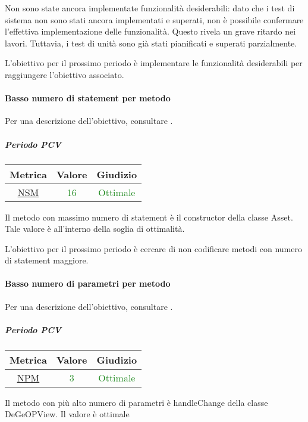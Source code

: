 			Non sono state ancora implementate funzionalità desiderabili: dato che i test di sistema non sono stati ancora implementati e superati, non è possibile confermare l'effettiva implementazione delle funzionalità. Questo rivela un grave ritardo nei lavori. Tuttavia, i test di unità sono già stati pianificati e superati parzialmente. 
			
			
			L'obiettivo per il prossimo periodo è implementare le funzionalità desiderabili per raggiungere l'obiettivo associato.
			
			\newpage
			
			\paragraph{Basso numero di statement per metodo}
			Per una descrizione dell'obiettivo, consultare .
				\subparagraph{Periodo PCV}
			
			\begin{table}[H]
				\centering
				\begin{tabular}{  c | c | c}
					\hline
					\textbf{Metrica} & \textbf{Valore} & \textbf{Giudizio} \\
					\hline
					\hyperref[MMC]{NSM}   & \textcolor{ForestGreen}{16}          & \textcolor{ForestGreen}{Ottimale}  \\ \hline
				\end{tabular} 
			\end{table}
			Il metodo con massimo numero di statement è il constructor della classe Asset. Tale valore è all'interno della soglia di ottimalità.
			
			L'obiettivo per il prossimo periodo è cercare di non codificare metodi con numero di statement maggiore.
			
		\newpage
			\paragraph{Basso numero di parametri per metodo}
			Per una descrizione dell'obiettivo, consultare .
				\subparagraph{Periodo PCV}
				
				\begin{table}[H]
					\centering
					\begin{tabular}{  c | c | c}
						\hline
						\textbf{Metrica} & \textbf{Valore} & \textbf{Giudizio} \\
						\hline
						\hyperref[MMC]{NPM}   & \textcolor{ForestGreen}{3}          & \textcolor{ForestGreen}{Ottimale}  \\ \hline
					\end{tabular} 
				\end{table}
			Il metodo con più alto numero di parametri è handleChange della classe DeGeOPView. Il valore è ottimale
			
